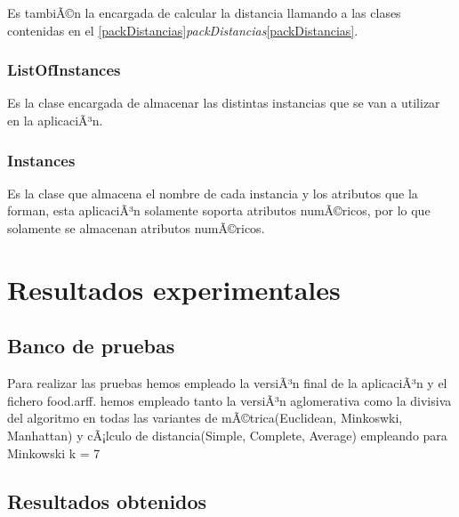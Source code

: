 \documentclass[11pt, titlepage,a4paper]{article}
\begin{document}
Es tambiÃ©n la encargada de calcular la distancia llamando a las clases
contenidas en el
\ref{packDistancias}\textit{packDistancias}\ref{packDistancias}.

\subsubsection{ListOfInstances}
Es la clase encargada de almacenar las distintas instancias que se van a
utilizar en la aplicaciÃ³n.

\subsubsection{Instances}
Es la clase que almacena el nombre de cada instancia y los atributos que la
forman, esta aplicaciÃ³n solamente soporta atributos numÃ©ricos, por lo que
solamente se almacenan atributos numÃ©ricos.


\section{Resultados experimentales}

\subsection{Banco de pruebas}
Para realizar las pruebas hemos empleado la versiÃ³n final de la aplicaciÃ³n y el
fichero food.arff. hemos empleado tanto la versiÃ³n aglomerativa como la divisiva
del algoritmo en todas las variantes de mÃ©trica(Euclidean, Minkoswki, Manhattan)
y cÃ¡lculo de distancia(Simple, Complete, Average) empleando para Minkowski k = 7


\subsection{Resultados obtenidos}
\end{document}
